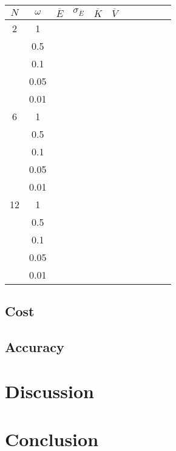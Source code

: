 \documentclass[a4paper,English,10pt]{article}
\renewcommand{\bar}{\overline}
\begin{document}
\begin{table}
  \begin{center}
    \caption{}
    \label{Etab}
    
    \begin{tabular}{*{11}c}
      \toprule
      $N$ & $\omega$ & $\bar{E}$  & $\sigma_{\bar{E}}$ &  $\bar{K}$ & $\bar{V}$& & & & \\
      \midrule
      2 & 1 &  & & & & & & &\\
      & 0.5 &  & & & & & & &\\
      & 0.1 &  & & & & & & &\\
      & 0.05&  & & & & & & &\\
      & 0.01&  & & & & & & &\\
      \midrule
      6 & 1 &  & & & & & & &\\
      & 0.5 &  & & & & & & &\\
      & 0.1 &  & & & & & & &\\
      & 0.05&  & & & & & & &\\
      & 0.01&  & & & & & & &\\
      \midrule
      12 & 1 &  & & & & & & &\\
      & 0.5 &  & & & & & & &\\
      & 0.1 &  & & & & & & &\\
      & 0.05&  & & & & & & &\\
      & 0.01&  & & & & & & &\\
     
      
      \bottomrule
    \end{tabular}
    \end{center}
\end{table}


\subsection{Cost}

\subsection{Accuracy}


\section{Discussion}

\section{Conclusion}
\end{document}
